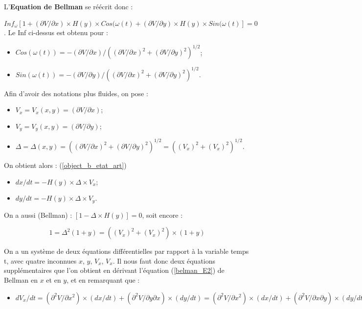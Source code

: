 {L'\textbf{Equation de Bellman} se réécrit donc : 

$Inf_\omega [ 1 +  ( \partial V/ \partial x)\times H(y) \times Cos(\omega(t) + ( \partial V/ \partial y)\times H(y)\times Sin(\omega(t)] = 0$. Le Inf ci-dessus est obtenu pour :

\begin{itemize}[label=$\square$]
	\item	$Cos(\omega(t)) =  - ( \partial V/ \partial x)/(( \partial V/ \partial x)^2+ ( \partial V/ \partial y)^2)^{1/2} $; 
	\item	$Sin(\omega(t)) = - ( \partial V/ \partial y)/(( \partial V/ \partial x)^2+ ( \partial V/ \partial y)^2)^{1/2} $.
\end{itemize}
Afin d'avoir des notations plus fluides, on pose : 
\begin{itemize}[label=$\square$]
	\item	$V_x = V_x(x,y) = ( \partial V/ \partial x) $; 
	\item	$V_y= V_y(x,y) = ( \partial V/ \partial y) $;
	\item	$\Delta = \Delta(x,y) = (( \partial V/ \partial x)^2+ ( \partial V/ \partial y)^2)^{1/2}  = ((V_x)^2+ (V_x)^2)^{1/2} $.
\end{itemize}
On obtient alors : (\ref{object_b_etat_art})
\begin{itemize}[label=$\square$]
	\item	$dx/dt = - H(y)\times \Delta \times V_x$;
	\item $	dy/dt = - H(y)\times \Delta\times V_y$.
\end{itemize}
On a aussi (Bellman) : $[1 -  \Delta \times H(y)] = 0$, soit encore :

\begin{equation}
\label{belman_E2}
1 = \Delta^2 (1+y) = ((V_x)^2+ (V_x)^2)\times (1+y)
\end{equation}


On a un système de deux équations différentielles par rapport à la variable temps t, avec quatre inconnues $x$, $y$, $V_x$, $V_x$. Il nous faut donc deux équations supplémentaires que l'on obtient en dérivant l'équation (\ref{belman_E2}) de Bellman en $x$ et en $y$, et en remarquant que : 

\begin{itemize}[label=$\square$]
	\item$	dV_x /dt =  ( \partial^2V/ \partial x^2)\times (dx/dt) + ( \partial^2 V/ \partial y \partial x)\times (dy/dt) = ( \partial^2 V/ \partial x^2)\times (dx/dt) + ( \partial^2 V/ \partial x \partial y)\times (dy/dt) = ( \partial V_x/ \partial x)\times (dx/dt) + ( \partial V_y/ \partial x)\times (dy/dt)$
	

\end{itemize}}
